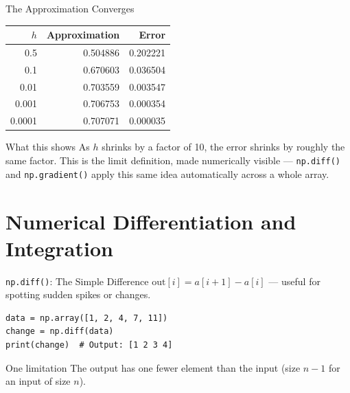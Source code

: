 \documentclass[9pt,aspectratio=169,xcolor=table]{beamer}
\begin{document}
\begin{frame}{The Approximation Converges}
    \leavevmode
    \small
    \begin{center}
    \begin{tabular}{@{}rrr@{}}
        \toprule
        $h$ & Approximation & Error \\
        \midrule
        0.5    & 0.504886 & 0.202221 \\
        0.1    & 0.670603 & 0.036504 \\
        0.01   & 0.703559 & 0.003547 \\
        0.001  & 0.706753 & 0.000354 \\
        0.0001 & 0.707071 & 0.000035 \\
        \bottomrule
    \end{tabular}
    \end{center}

    \vspace{3mm}
    \begin{block}{What this shows}
        As $h$ shrinks by a factor of 10, the error shrinks by roughly
        the same factor. This \alert{is} the limit definition, made
        numerically visible --- \texttt{np.diff()} and
        \texttt{np.gradient()} apply this same idea automatically
        across a whole array.
    \end{block}
\end{frame}

\section{Numerical Differentiation and Integration}

\begin{frame}[fragile]{\texttt{np.diff()}: The Simple Difference}
    \leavevmode
    $\text{out}[i] = a[i+1] - a[i]$ --- useful for spotting sudden
    spikes or changes.

\begin{lstlisting}
data = np.array([1, 2, 4, 7, 11])
change = np.diff(data)
print(change)  # Output: [1 2 3 4]
\end{lstlisting}

    \vspace{2mm}
    \begin{alertblock}{One limitation}
        The output has \alert{one fewer element} than the input (size
        $n-1$ for an input of size $n$).
    \end{alertblock}
\end{frame}
\end{document}
